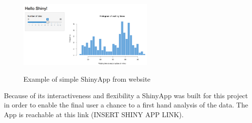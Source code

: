 \begin{figure}[H]
\begin{center}
\includegraphics[width=0.6\textwidth, keepaspectratio]{shiny_example.png} \\
\caption{Example of simple ShinyApp from website}
\label{figure:shiny_example}
\end{center}
\end{figure}

Because of its interactiveness and flexibility a ShinyApp was built for this project in order to enable the final user a chance to a first hand analysis of the data. The App is reachable at this link (INSERT SHINY APP LINK).
